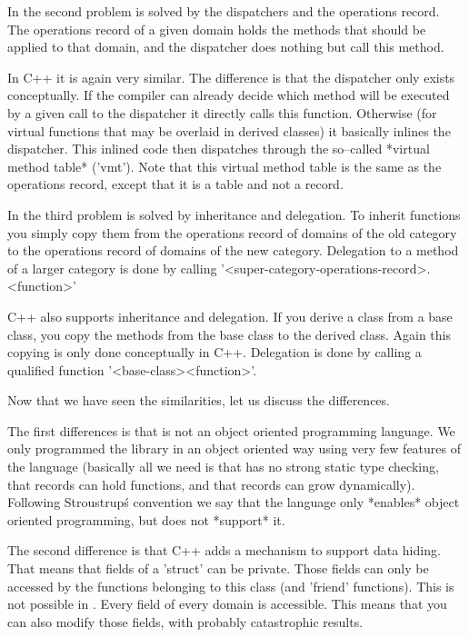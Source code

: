 In  {\GAP}  the  second  problem  is solved by  the  dispatchers and  the
operations  record.  The  operations record  of a  given domain holds the
methods that  should be  applied to that domain, and the dispatcher  does
nothing but call this method.

In C++ it is  again very  similar.  The difference is that the dispatcher
only  exists conceptually.  If  the compiler  can  already  decide  which
method will  be executed  by a given call to  the  dispatcher it directly
calls  this function.   Otherwise  (for virtual  functions  that  may  be
overlaid  in derived classes) it  basically inlines the dispatcher.  This
inlined  code  then  dispatches  through the  so--called *virtual  method
table*  ('vmt').  Note that this virtual  method table is the same as the
operations record, except that it is a table and not a record.

In {\GAP} the third problem is solved by inheritance and  delegation.  To
inherit  functions you simply  copy  them  from the operations record  of
domains  of the old category to the  operations  record of domains of the
new  category.  Delegation to  a  method of a larger  category is done by
calling '<super-category-operations-record>.<function>'

C++ also supports inheritance and delegation.  If you derive a class from
a base class, you  copy the methods  from  the base class to  the derived
class.  Again this copying is  only done conceptually in C++.  Delegation
is done by calling a qualified function '<base-class>\:\:<function>'.

Now that we have seen the similarities, let us discuss the differences.

The  first  differences  is  that  {\GAP}  is  not   an  object  oriented
programming  language.   We  only  programmed  the  library in an  object
oriented way  using very few features of  the  language (basically all we
need  is that {\GAP} has no strong static type checking, that records can
hold  functions,  and  that  records  can  grow  dynamically).  Following
Stroustrup\'s convention we  say that the {\GAP}  language only *enables*
object oriented programming, but does not *support* it.

The second  difference  is that  C++  adds  a  mechanism to  support data
hiding.   That  means that fields  of a 'struct'  can be  private.  Those
fields can only be accessed by the functions belonging to this class (and
'friend'  functions).  This is not  possible  in {\GAP}.  Every field  of
every domain is accessible.  This means that  you  can also  modify those
fields, with probably catastrophic results.


